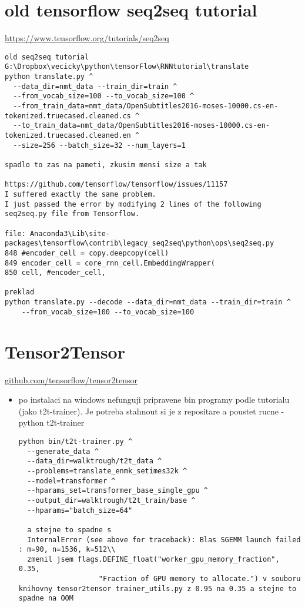 \section{old tensorflow seq2seq tutorial}
\url{https://www.tensorflow.org/tutorials/seq2seq}
\begin{lstlisting}
old seq2seq tutorial G:\Dropbox\vecicky\python\tensorFlow\RNNtutorial\translate
python translate.py ^
  --data_dir=nmt_data --train_dir=train ^
  --from_vocab_size=100 --to_vocab_size=100 ^
  --from_train_data=nmt_data/OpenSubtitles2016-moses-10000.cs-en-tokenized.truecased.cleaned.cs ^
  --to_train_data=nmt_data/OpenSubtitles2016-moses-10000.cs-en-tokenized.truecased.cleaned.en ^
  --size=256 --batch_size=32 --num_layers=1

spadlo to zas na pameti, zkusim mensi size a tak

https://github.com/tensorflow/tensorflow/issues/11157
I suffered exactly the same problem.
I just passed the error by modifying 2 lines of the following seq2seq.py file from Tensorflow.

file: Anaconda3\Lib\site-packages\tensorflow\contrib\legacy_seq2seq\python\ops\seq2seq.py
848 #encoder_cell = copy.deepcopy(cell)
849 encoder_cell = core_rnn_cell.EmbeddingWrapper(
850 cell, #encoder_cell,

preklad
python translate.py --decode --data_dir=nmt_data --train_dir=train ^
    --from_vocab_size=100 --to_vocab_size=100
\end{lstlisting}

\section{Tensor2Tensor}
\url{github.com/tensorflow/tensor2tensor}
\begin{itemize}
  \item po instalaci na windows nefunguji pripravene bin programy podle tutorialu (jako t2t-trainer). Je potreba stahnout si je z repositare a poustet rucne - python t2t-trainer
  \begin{lstlisting}
python bin/t2t-trainer.py ^
  --generate_data ^
  --data_dir=walktrough/t2t_data ^
  --problems=translate_enmk_setimes32k ^
  --model=transformer ^
  --hparams_set=transformer_base_single_gpu ^
  --output_dir=walktrough/t2t_train/base ^
  --hparams="batch_size=64"

  a stejne to spadne s
  InternalError (see above for traceback): Blas SGEMM launch failed : m=90, n=1536, k=512\\
  zmenil jsem flags.DEFINE_float("worker_gpu_memory_fraction", 0.35,
                   "Fraction of GPU memory to allocate.") v souboru knihovny tensor2tensor trainer_utils.py z 0.95 na 0.35 a stejne to spadne na OOM
  \end{lstlisting}
\end{itemize}


